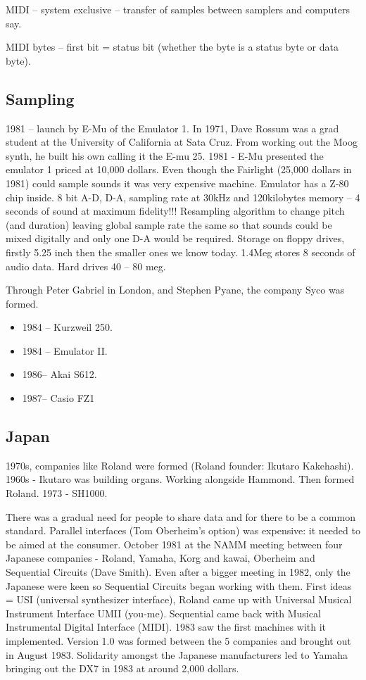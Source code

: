 MIDI – system exclusive – transfer of samples between samplers and computers say.

MIDI bytes – first bit = status bit (whether the byte is a status byte or data byte).

\subsection{Sampling}

1981 – launch by E-Mu of the Emulator 1. In 1971, Dave Rossum was a grad student at the University of California at Sata Cruz.  From working out the Moog synth, he built his own calling it the E-mu 25. 1981 - E-Mu presented the emulator 1 priced at 10,000 dollars.
Even though the Fairlight (25,000 dollars in 1981) could sample sounds it was very expensive machine.  Emulator has a Z-80 chip inside. 8 bit A-D, D-A, sampling rate at 30kHz and 120kilobytes memory – 4 seconds of sound at maximum fidelity!!!   Resampling algorithm to change pitch (and duration) leaving global sample rate the same so that sounds could be mixed digitally and only one D-A would be required.  Storage on floppy drives, firstly 5.25 inch then the smaller ones we know today.  1.4Meg stores 8 seconds of audio data.  Hard drives 40 – 80 meg.

Through Peter Gabriel in London, and Stephen Pyane, the company Syco was formed.

\begin{itemize}
\item 1984 – Kurzweil 250.
\item 1984 – Emulator II.
\item 1986– Akai S612. 
\item 1987– Casio FZ1
\end{itemize}

\subsection{Japan}
1970s, companies like Roland were formed (Roland founder: Ikutaro Kakehashi). 1960s - Ikutaro was building organs.  Working alongside Hammond. Then formed Roland. 1973 - SH1000. 

There was a gradual need for people to share data and for there to be a common standard. Parallel interfaces (Tom Oberheim's option) was expensive: it needed to be aimed at the consumer.  October 1981 at the NAMM meeting between four Japanese companies - Roland, Yamaha, Korg and kawai, Oberheim and Sequential Circuits (Dave Smith).  Even after a bigger meeting in 1982, only the Japanese were keen so Sequential Circuits began working with them.  First ideas = USI (universal synthesizer interface), Roland came up with Universal Musical Instrument Interface UMII (you-me).  Sequential came back with Musical Instrumental Digital Interface (MIDI). 1983 saw the first machines with it implemented. Version 1.0 was formed between the 5 companies and brought out in August 1983.   Solidarity amongst the Japanese manufacturers led to Yamaha bringing out the DX7 in 1983 at around 2,000 dollars.

